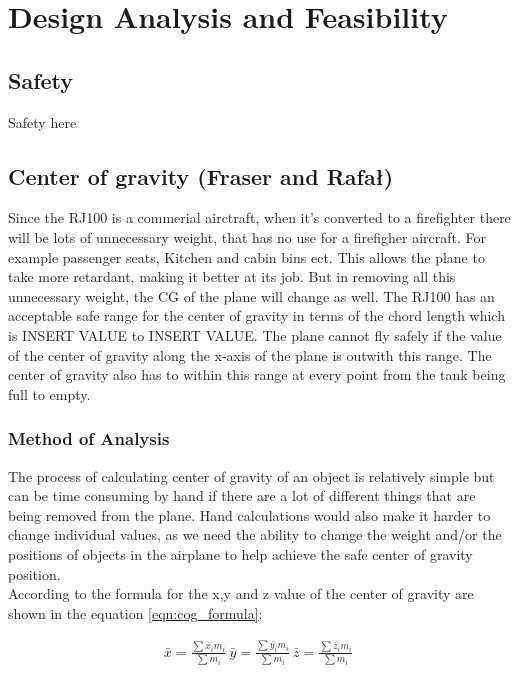 \chapter{Design Analysis and Feasibility}
\section{Safety}
Safety here



\section{Center of gravity (Fraser and Rafał)}

Since the RJ100 is a commerial airctraft, when it's converted to a firefighter there will be lots of unnecessary weight, that has no use for a firefigher aircraft.
For example passenger seats, Kitchen and cabin bins ect.
This allows the plane to take more retardant, making it better at its job.
But in removing all this unnecessary weight, the CG of the plane will change as well.
The RJ100 has an acceptable safe range for the center of gravity in terms of the chord length which is INSERT VALUE to INSERT VALUE.
The plane cannot fly safely if the value of the center of gravity along the x-axis of the plane is outwith this range.
The center of gravity also has to within this range at every point from the tank being full to empty.

\subsection{Method of Analysis}
The process of calculating center of gravity of an object is relatively simple but can be time consuming by hand if there are a lot of different things that are being removed from the plane.
Hand calculations would also make it harder to change individual values, as we need the ability to change the weight and/or the positions of objects in the airplane to help achieve the safe center of gravity position. \\

According to \cite{baker2020engineering} the formula for the x,y and z value of the center of gravity are shown in the equation \ref{eqn:cog_formula}:

\begin{equation}
\begin{split}
  \bar{x} = \frac{\sum{ \bar{x_{i}} m_{i} }}{ \sum{ m_{i}}} \
  \bar{y} = \frac{\sum{ \bar{y_{i}} m_{i} }}{ \sum{ m_{i}}} \
  \bar{z} = \frac{\sum{ \bar{z_{i}} m_{i} }}{ \sum{ m_{i}}} \
\end{split}
\label{eqn:cog_formula}
\end{equation}

